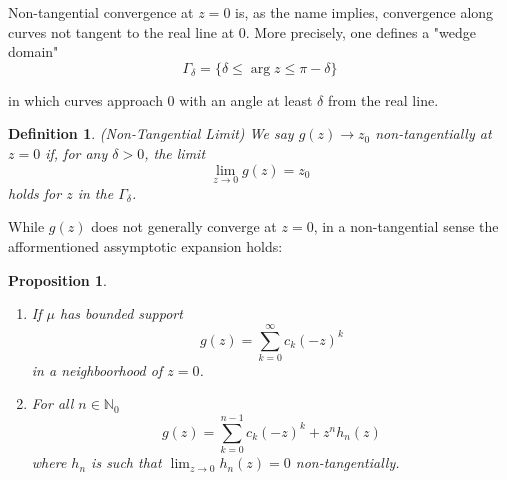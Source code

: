 \documentclass{amsart}
\newtheorem{proposition}[theorem]{Proposition}
\newtheorem{definition}[theorem]{Definition}
\theoremstyle{remark}
\numberwithin{equation}{section}
\newcommand{\NN}{\mathbb{N}}
\begin{document}
Non-tangential convergence at $z = 0$ is, as the name implies, convergence along curves not tangent to the real line at $0$. More precisely, one defines a "wedge domain"
\[
    \Gamma_\delta = \{\delta \leq \arg z \leq \pi - \delta\}
\]
\begin{figure}
\end{figure}
in which curves approach $0$ with an angle at least $\delta$ from the real line.

\begin{definition} (Non-Tangential Limit)
    We say $g(z) \rightarrow z_0$ non-tangentially at $z = 0$ if, for any $\delta > 0$, the limit 
    \[
        \lim_{z \rightarrow 0} g(z) = z_0
    \]
    holds for $z$ in the $\Gamma_\delta$.
\end{definition}


While $g(z)$ does not generally converge at $z = 0$, in a non-tangential sense the afformentioned assymptotic expansion holds:
\begin{proposition}
\begin{enumerate}
\item If $\mu$ has bounded support
\[
    g(z) = \sum_{k = 0}^\infty c_k(-z)^k
\]
in a neighboorhood of $z=0$.
\item For all $n \in \NN_0$
\begin{equation}
    g(z) = \sum_{k = 0}^{n-1} c_k(-z)^k + z^n h_n(z) \label{assexp}
\end{equation}
where $h_n$ is such that $\lim_{z \rightarrow 0} h_n(z) = 0$ non-tangentially.
\end{enumerate}
\end{proposition}
\end{document}

